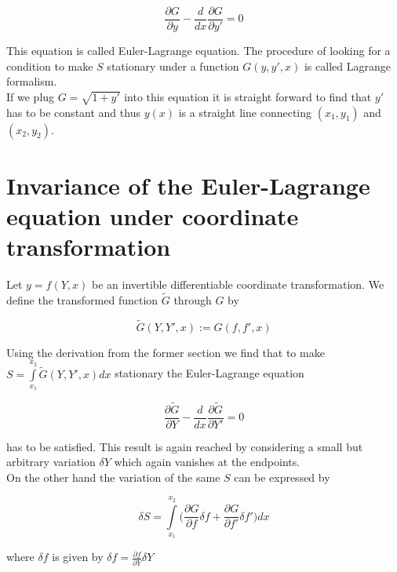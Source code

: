 \documentclass{article}
\begin{document}
\begin{equation}
\frac{\partial G}{\partial y} - \frac{d}{dx}\frac{\partial G}{\partial y'} = 0
\end{equation}

This equation is called Euler-Lagrange equation. The procedure of looking for a condition to make $S$ stationary under a function $G(y,y',x)$ is called Lagrange formalism.\\

If we plug $G = \sqrt{1+y'}$ into this equation it is straight forward to find that $y'$ has to be constant and thus $y(x)$ is a straight line connecting $(x_1,y_1)$ and $(x_2,y_2)$.

\section{Invariance of the Euler-Lagrange equation under coordinate transformation \cite{Kleinert}}

Let $y=f(Y,x)$ be an invertible differentiable coordinate transformation. We define the transformed function $\widetilde{G}$ through $G$ by

\begin{equation}
\widetilde{G}(Y,Y',x) := G(f,f',x)
\end{equation}

Using the derivation from the former section we find that to make $S = \int\limits_{x_1}^{x_2} \widetilde{G}(Y,Y',x) dx$ stationary the Euler-Lagrange equation

\begin{equation}
\frac{\partial \widetilde{G}}{\partial Y} 
- \frac{d}{dx}\frac{\partial \widetilde{G}}{\partial Y'} = 0
\end{equation}

has to be satisfied. This result is again reached by considering a small but arbitrary variation $\delta Y$ which again vanishes at the endpoints.\\

On the other hand the variation of the same $S$ can be expressed by

\begin{equation}
\delta S = \int\limits_{x_1}^{x_2} \bigg( \frac{\partial G}{\partial f} \delta f 
+ \frac{\partial G}{\partial f'} \delta f' \bigg) dx
\end{equation}

where $\delta f$ is given by $\delta f = \frac{\partial f}{\partial Y} \delta Y$ \\
\end{document}
